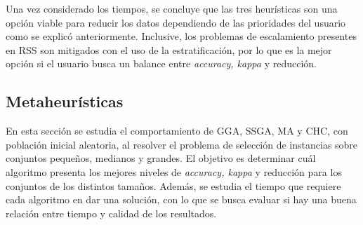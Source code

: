 Una vez considerado los tiempos, se concluye que las tres heurísticas son una opción viable para reducir los datos dependiendo de las prioridades del usuario como se explicó anteriormente. Inclusive, los problemas de escalamiento presentes en RSS son mitigados con el uso de la estratificación, por lo que es la mejor opción si el usuario busca un balance entre \emph{accuracy, kappa} y reducción.



\subsection{Metaheurísticas}

En esta sección se estudia el comportamiento de GGA, SSGA, MA y CHC, con población inicial aleatoria, al resolver el problema de selección de instancias sobre conjuntos pequeños, medianos y grandes. El objetivo es determinar cuál algoritmo presenta los mejores niveles de \emph{accuracy, kappa} y reducción para los conjuntos de los distintos tamaños. Además, se estudia el tiempo que requiere cada algoritmo en dar una solución, con lo que se busca evaluar si hay una buena relación entre tiempo y calidad de los resultados.


